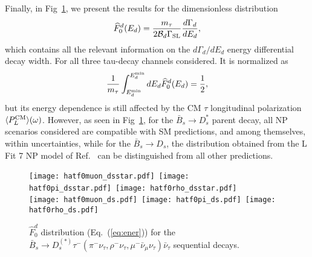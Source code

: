 \documentclass[aps,superscriptaddress,showpacs,nofootinbib,11pt]{revtex4-1}
\newcommand{\be}{\begin{equation}} \newcommand{\ee}{\end{equation}}
\begin{document}
Finally, in Fig~\ref{fig:dstardsener}, we present the results for the dimensionless distribution
%
\be
\widehat F^d_0(E_d)=\frac{m_\tau}{2{\cal B}_d\Gamma_{\rm SL}}\frac{d\Gamma_d}{dE_d},
\label{eq:ener}
\ee
%
which contains all the relevant information on the $d\Gamma_d/dE_d$ energy differential decay width. For all three tau-decay channels considered. It is normalized  as
%
\be
\frac{1}{m_\tau}\int_{E_d^{\rm min}}^{E_d^{\rm min}} dE_d \widehat F^d_0(E_d)
= \frac12,
\ee
%
but  its energy dependence is still affected by the CM $\tau$ longitudinal polarization 
$\langle P^{\rm CM}_L\rangle(\omega)$. However, as seen in Fig~\ref{fig:dstardsener}, for the $\bar B_s\to D^*_s$ parent decay,  all NP scenarios considered are compatible with SM predictions, and among themselves, within uncertainties, while for the $\bar B_s\to D_s$, the distribution obtained from the L Fit 7 NP model of Ref.~\cite{Murgui:2019czp} can be distinguished from all other predictions.
%
\begin{figure}
\begin{center}
\texttt{[image: hatf0muon\_dsstar.pdf]}\
\texttt{[image: hatf0pi\_dsstar.pdf]}\
\texttt{[image: hatf0rho\_dsstar.pdf]}\\
\texttt{[image: hatf0muon\_ds.pdf]}\
\texttt{[image: hatf0pi\_ds.pdf]}\ 
\texttt{[image: hatf0rho\_ds.pdf]}
\caption{ $\widehat F^d_0$ distribution (Eq.~(\ref{eq:ener})) for the $\bar B_s\to D_s^{(*)}\tau^-(\pi^-\nu_\tau,\rho^-\nu_\tau,\mu^-\bar\nu_\mu\nu_\tau)\bar\nu_\tau$ sequential decays.}
\label{fig:dstardsener}
\end{center}
\end{figure}



%
\end{document}
